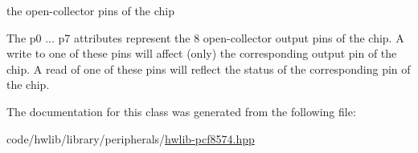the open-\/collector pins of the chip

The p0 ... p7 attributes represent the 8 open-\/collector output pins of the chip. A write to one of these pins will affect (only) the corresponding output pin of the chip. A read of one of these pins will reflect the status of the corresponding pin of the chip. 

The documentation for this class was generated from the following file\+:\begin{DoxyCompactItemize}
\item 
code/hwlib/library/peripherals/\hyperlink{hwlib-pcf8574_8hpp}{hwlib-\/pcf8574.\+hpp}\end{DoxyCompactItemize}
